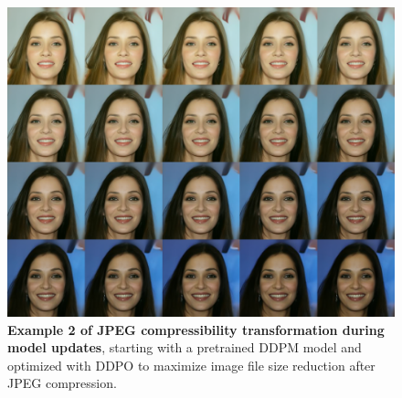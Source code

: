\begin{appendixs}
        \begin{figure}
            \centering
            \includegraphics[scale=1.40]{img/results/compressibility_44.png}
            \vspace{-0pt}  %
            \captionsetup{width=\textwidth} %
            \caption{\textbf{Example 2 of JPEG compressibility transformation during model updates}, starting with a pretrained DDPM model and optimized with DDPO to maximize image file size reduction after JPEG compression.}
            \label{fig:ddpm-to-ddpo-compressibility-extra2}
        \end{figure}


\end{appendixs}

